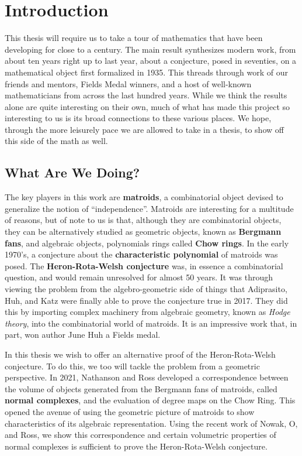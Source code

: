 \documentclass[12pt,oneside]{../../sfsuthesis}
\begin{document}
\chapter{Introduction}


This thesis will require us to take a tour of mathematics that have been developing for close to a century.
The main result synthesizes modern work, from about ten years right up to last year, about a conjecture, posed in seventies, on a mathematical object first formalized in 1935.
This threads through work of our friends and mentors, Fields Medal winners, and a host of well-known mathematicians from across the last hundred years.
While we think the results alone are quite interesting on their own, much of what has made this project so interesting to us is its broad connections to these various places.
We hope, through the more leisurely pace we are allowed to take in a thesis, to show off this side of the math as well.

\section{What Are We Doing?}

The key players in this work are \textbf{matroids}, a combinatorial object devised to generalize the notion of ``independence''.
Matroids are interesting for a multitude of reasons, but of note to us is that, although they are combinatorial objects, they can be alternatively studied as geometric objects, known as \textbf{Bergmann fans}, and algebraic objects, polynomials rings called \textbf{Chow rings}.
In the early 1970's, a conjecture about the \textbf{characteristic polynomial} of matroids was posed.
The \textbf{Heron-Rota-Welsh conjecture} was, in essence a combinatorial question, and would remain unresolved for almost 50 years.
It was through viewing the problem from the algebro-geometric side of things that Adiprasito, Huh, and Katz were finally able to prove the conjecture true in 2017.
They did this by importing complex machinery from algebraic geometry, known as \emph{Hodge theory}, into the combinatorial world of matroids.
It is an impressive work that, in part, won author June Huh a Fields medal.

In this thesis we wish to offer an alternative proof of the Heron-Rota-Welsh conjecture.
To do this, we too will tackle the problem from a geometric perspective.
In 2021, Nathanson and Ross developed a correspondence between the volume of objects generated from the Bergmann fans of matroids, called \textbf{normal complexes}, and the evaluation of degree maps on the Chow Ring.
This opened the avenue of using the geometric picture of matroids to show characteristics of its algebraic representation.
Using the recent work of Nowak, O, and Ross, we show this correspondence and certain volumetric properties of normal complexes is sufficient to prove the Heron-Rota-Welsh conjecture.
\end{document}

